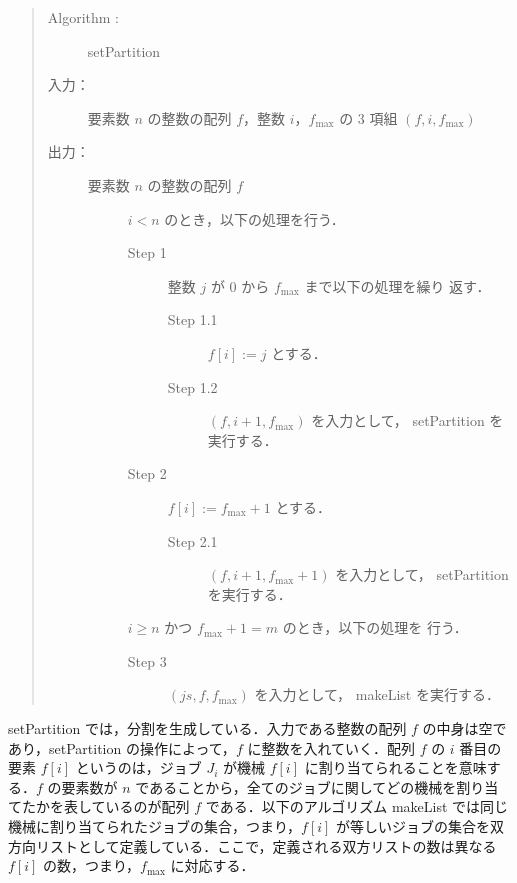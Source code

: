 \documentclass[12pt]{optlab-bachelor}
\begin{document}
\begin{quote}
  \begin{description}
    \item[{\sc Algorithm : }]  {\sc setPartition}
    \item[入力：]  要素数 $n$ の整数の配列 $f$，整数 $i$，$f_{\max}$
    の 3 項組 $(f, i, f_{\max})$
    \item[出力：] 要素数 $n$ の整数の配列 $f$
    \begin{description}
      \item[]  $i < n$ のとき，以下の処理を行う．
      \begin{description}
        \item[Step 1 ] 整数 $j$ が 0 から $f_{\max}$ まで以下の処理を繰り
        返す．

        \begin{description}
          \item[Step 1.1 ] $f[i] := j$ とする．
          \item[Step 1.2 ] $(f, i + 1, f_{\max})$ を入力として， {\sc
          setPartition} を実行する．
        \end{description}

        \item[Step 2]  $f[i] := f_{\max} + 1$ とする．

        \begin{description}
          \item[Step 2.1 ] $(f,i + 1,f_{\max} + 1)$ を入力として，
          {\sc setPartition} を実行する．
        \end{description}

      \end{description}
      \item[]  $i \ge n$ かつ $f_{\max} + 1 = m$ のとき，以下の処理を
      行う．
      \begin{description}
        \item[Step 3 ] $(js,f,f_{\max})$ を入力として， {\sc makeList} を実行する．
      \end{description}
    \end{description}
  \end{description}
\end{quote}

{\sc setPartition} では，分割を生成している．入力である整数の配列 $f$ の中身は空であり，{\sc setPartition} の操作によって，$f$ に整数を入れていく．配列 $f$ の $i$ 番目の要素 $f[i]$ というのは，ジョブ $J_i$ が機械 $f[i]$ に割り当てられることを意味する．$f$ の要素数が $n$ であることから，全てのジョブに関してどの機械を割り当てたかを表しているのが配列 $f$ である．以下のアルゴリズム {\sc makeList} では同じ機械に割り当てられたジョブの集合，つまり，$f[i]$ が等しいジョブの集合を双方向リストとして定義している．ここで，定義される双方リストの数は異なる $f[i]$ の数，つまり，$f_{\max}$ に対応する．
\end{document}
